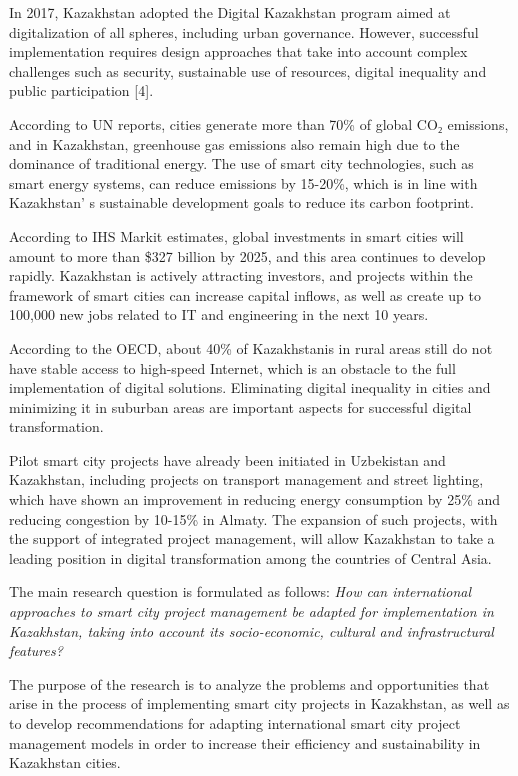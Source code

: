 In 2017, Kazakhstan adopted the Digital Kazakhstan program aimed at
digitalization of all spheres, including urban governance. However,
successful implementation requires design approaches that take into
account complex challenges such as security, sustainable use of
resources, digital inequality and public participation {[}4{]}.

According to UN reports, cities generate more than 70\% of global CO₂
emissions, and in Kazakhstan, greenhouse gas emissions also remain high
due to the dominance of traditional energy. The use of smart city
technologies, such as smart energy systems, can reduce emissions by
15-20\%, which is in line with Kazakhstan' s sustainable
development goals to reduce its carbon footprint.

According to IHS Markit estimates, global investments in smart cities
will amount to more than \$327 billion by 2025, and this area continues
to develop rapidly. Kazakhstan is actively attracting investors, and
projects within the framework of smart cities can increase capital
inflows, as well as create up to 100,000 new jobs related to IT and
engineering in the next 10 years.

According to the OECD, about 40\% of Kazakhstanis in rural areas still
do not have stable access to high-speed Internet, which is an obstacle
to the full implementation of digital solutions. Eliminating digital
inequality in cities and minimizing it in suburban areas are important
aspects for successful digital transformation.

Pilot smart city projects have already been initiated in Uzbekistan and
Kazakhstan, including projects on transport management and street
lighting, which have shown an improvement in reducing energy consumption
by 25\% and reducing congestion by 10-15\% in Almaty. The expansion of
such projects, with the support of integrated project management, will
allow Kazakhstan to take a leading position in digital transformation
among the countries of Central Asia.

The main research question is formulated as follows: \emph{How can
international approaches to smart city project management be adapted for
implementation in Kazakhstan, taking into account its socio-economic,
cultural and infrastructural features?}

The purpose of the research is to analyze the problems and opportunities
that arise in the process of implementing smart city projects in
Kazakhstan, as well as to develop recommendations for adapting
international smart city project management models in order to increase
their efficiency and sustainability in Kazakhstan cities.

